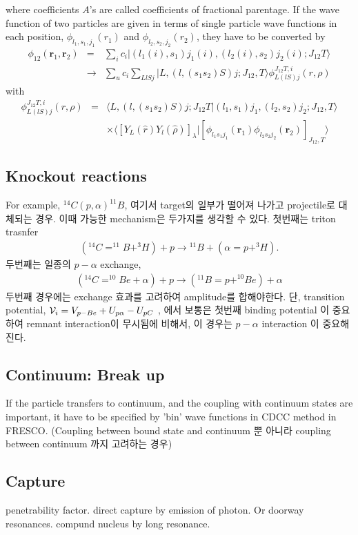\documentclass[11pt]{book}
\def\bm{\boldsymbol}
\def\vr{{\bm r}}
\def\la{\langle}
\def\ra{\rangle}
\newcommand{\bea}{\begin{eqnarray}}
\newcommand{\eea}{\end{eqnarray}}
\newcommand{\no}{\nonumber \\}
\begin{document}
where coefficients $A$'s are 
called coefficients of fractional parentage.
If the wave function of two particles are 
given in terms of single particle wave functions in each position,
$\phi_{l_1,s_1,j_1}(r_1)$ and $\phi_{l_2,s_2,j_2}(r_2)$,
they have to be converted by
\bea 
\phi_{12}(\vr_1,\vr_2)
&=& 
 \sum_i c_i |(l_1(i),s_1)j_1(i),(l_2(i),s_2) j_2(i); J_{12} T\ra \no 
&\to& 
 \sum_{u} c_i \sum_{Ll S j}
 |L,(l,(s_1s_2)S)j;J_{12},T\ra 
 \phi^{J_{12}T,i}_{L(l S) j}(r,\rho)
\eea 
with
\bea 
\phi^{J_{12}T,i}_{L(l S) j}(r,\rho)
&=&\la L,(l,(s_1 s_2)S)j; J_{12} T| (l_1,s_1)j_1,(l_2,s_2)j_2;J_{12},T\ra
\no & &\times 
 \la [Y_{L}(\hat{r}) Y_{l}(\hat{\rho}) ]_{\lambda}
  | [\phi_{l_1 s_1 j_1}(\vr_1)\phi_{l_2s_2j_2}(\vr_2)]_{J_{12},T}\ra  
\eea 

\subsection{Knockout reactions}

For example, $^{14}C(p,\alpha)^{11}B$, 여기서 target의 일부가 떨어져 나가고
projectile로 대체되는  경우. 이때 가능한 mechanism은 두가지를 생각할 수 있다.
첫번째는 triton trasnfer
\bea 
\left( {}^{14}C=^{11}B+^3H\right)+p\to {}^{11}B+\left(\alpha=p+^{3}H\right).  
\eea 
두번째는 일종의 $p-\alpha$ exchange,
\bea 
\left( {}^{14}C=^{10}Be+\alpha\right)+p\to \left(^{11}B=p+^{10}Be\right)+\alpha
\eea 
두번째 경우에는 exchange 효과를 고려하여 amplitude를 합해야한다. 
단, transition potential, 
${\cal V}_i=V_{p-Be}+U_{p\alpha}-U_{pC}$ , 에서 보통은 첫번째 binding potential
이 중요하여 remnant interaction이 무시됨에 비해서, 이 경우는 $p-\alpha$ interaction 
이 중요해진다. 

\subsection{Continuum: Break up }
If the particle transfers to continuum,
and the coupling with continuum states are important, 
it have to be specified by 'bin' wave functions 
in CDCC method in FRESCO. (Coupling between bound state and continuum 뿐 아니라
coupling between continuum 까지 고려하는 경우)

\subsection{Capture}
penetrability factor. 
direct capture by emission of photon. Or
doorway resonances. compund nucleus by long resonance. 
\end{document}
